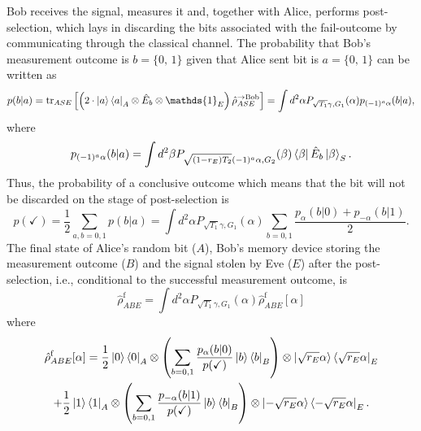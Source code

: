 \documentclass[a4paper]{article}
\newcommand{\tr}{\text{tr}}
\begin{document}
Bob receives the signal, measures it and, together with Alice, performs post-selection, which lays in discarding the bits associated with the fail-outcome by communicating through the classical channel.
The probability that Bob's measurement outcome is $b=\{0,\,1\}$ given that Alice sent bit is $a=\{0,\,1\}$ can be written as
%
\begin{equation}
\label{prob1}
    p(b|a)=\tr_{ASE}\left[{\left(2\cdot\ket{a}\bra{a}_A \otimes \hat{E}_b\otimes \mathds{1}_E\right) \hat{\rho}^{\rightarrow \text{Bob}}_{ASE}}\right]=\int d^2 \alpha P_{\sqrt{T_1}\gamma, G_1}(\alpha) p_{(-1)^a\alpha}(b|a),
\end{equation}
where 
\begin{equation}
\label{prob2}
\begin{gathered}
    p_{(-1)^a \alpha}(b | a) = \int d^2 \beta P_{\sqrt{(1 - r_E)T_2}(-1)^a\alpha, G_2}(\beta)\bra{\beta}\hat{E}_b\ket{\beta}_S.
\end{gathered}
\end{equation}
Thus, the probability of a conclusive outcome which means that the bit will not be discarded on the stage of post-selection is 
\begin{equation}
\label{checkmark}
    p(\checkmark) =\frac{1}{2}\sum_{a,b=0,1} p(b|a) = \int d^2 \alpha P_{\sqrt{T_1}\gamma, G_1}(\alpha)\sum\limits_{b = 0, 1}\frac{p_{\alpha}(b | 0) + p_{-\alpha}(b | 1)}{2}.
\end{equation}
The final state of Alice's random bit ($A$), Bob's memory device storing the measurement outcome ($B$) and the signal stolen by Eve ($E$) after the post-selection, i.e., conditional to the successful measurement outcome, is 
\begin{equation}
    \hat{\rho}^{\text{f}}_{ABE} = \int d^2 \alpha P_{\sqrt{T_1}\gamma, G_1}(\alpha)\hat{\rho}^{\text{f}}_{ABE}[\alpha] 
    \label{final}
\end{equation}
where
\begin{equation}
\begin{gathered}
    \hat{\rho}^{\text{f}}_{ABE}[\alpha] = \frac{1}{2}\ket{0}\bra{0}_{A} \otimes \left(\sum\limits_{b = 0, 1} \frac{p_{\alpha}(b | 0)}{p(\checkmark)}\ket{b}\bra{b}_{B}\right) \otimes \ket{\sqrt{r_E}\alpha}\bra{\sqrt{r_E}\alpha}_E\\
    + \frac{1}{2}\ket{1}\bra{1}_{A} \otimes \left(\sum\limits_{b = 0, 1} \frac{p_{-\alpha}(b | 1)}{p(\checkmark)}\ket{b}\bra{b}_{B}\right) \otimes \ket{-\sqrt{r_E}\alpha}\bra{-\sqrt{r_E}\alpha}_E.
    \label{rho_final}
\end{gathered}
\end{equation}
\end{document}

